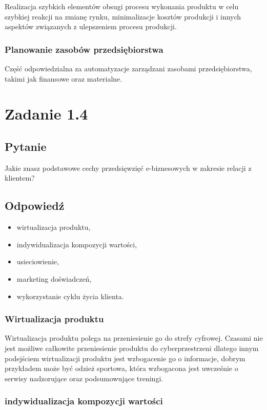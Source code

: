 \documentclass[paper=a4, fontsize=11pt]{scrartcl} %
\numberwithin{equation}{section} %
\numberwithin{figure}{section} %
\numberwithin{table}{section} %
\begin{document}
Realizacja szybkich elementów obsugi procesu wykonania produktu w celu szybkiej reakcji na zmianę rynku, minimalizacje kosztów produkcji i innych aspektów związanych z ulepszeniem procesu produkcji.

\subsubsection {Planowanie zasobów przedsiębiorstwa}

Część odpowiedzialna za automatyzacje zarządzani zasobami przedsiębiorstwa, takimi jak finansowe oraz materialne.

\section{Zadanie 1.4}

\subsection {Pytanie}

Jakie znasz podstawowe cechy przedsięwzięć e-biznesowych w zakresie relacji z klientem?

\subsection  {Odpowiedź}
\begin {itemize}
   \item wirtualizacja produktu,
   \item indywidualizacja kompozycji wartości,
   \item usieciowienie,
   \item marketing doświadczeń,
   \item wykorzystanie cyklu życia klienta.
\end {itemize}

\subsubsection {Wirtualizacja produktu}

Wirtualizacja produktu polega na przeniesienie go do strefy cyfrowej. Czasami nie jest możliwe całkowite przeniesienie produktu do cyberprzestrzeni dlatego innym podejściem wirtualizacji produktu
jest wzbogacenie go o informacje, dobrym przykładem może być odzież sportowa, która wzbogacona jest uwcześnie o serwisy nadzorujące oraz podsumowujące treningi.

\subsubsection {indywidualizacja kompozycji wartości} 
\end{document}
